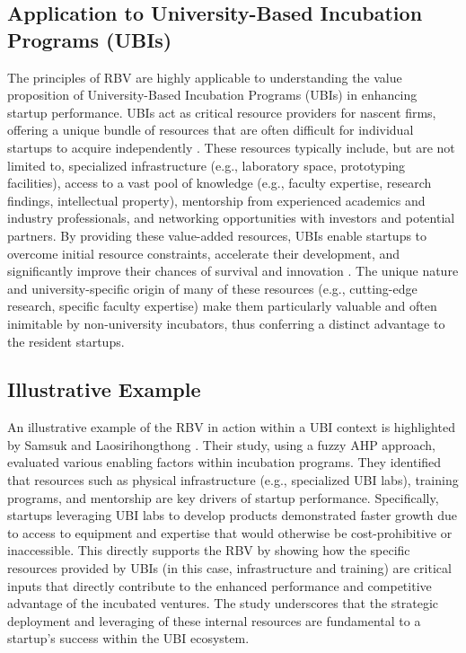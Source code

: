 \documentclass[../Main.tex]{subfiles}
\begin{document}
\subsection{Application to University-Based Incubation Programs (UBIs)}
The principles of RBV are highly applicable to understanding the value proposition of University-Based Incubation Programs (UBIs) in enhancing startup performance. UBIs act as critical resource providers for nascent firms, offering a unique bundle of resources that are often difficult for individual startups to acquire independently \cite{mian1996assessing}. These resources typically include, but are not limited to, specialized infrastructure (e.g., laboratory space, prototyping facilities), access to a vast pool of knowledge (e.g., faculty expertise, research findings, intellectual property), mentorship from experienced academics and industry professionals, and networking opportunities with investors and potential partners. By providing these value-added resources, UBIs enable startups to overcome initial resource constraints, accelerate their development, and significantly improve their chances of survival and innovation \cite{mian1996assessing}. The unique nature and university-specific origin of many of these resources (e.g., cutting-edge research, specific faculty expertise) make them particularly valuable and often inimitable by non-university incubators, thus conferring a distinct advantage to the resident startups.

\subsection{Illustrative Example}
An illustrative example of the RBV in action within a UBI context is highlighted by Samsuk and Laosirihongthong \cite{samsuk2014fuzzy}. Their study, using a fuzzy AHP approach, evaluated various enabling factors within incubation programs. They identified that resources such as physical infrastructure (e.g., specialized UBI labs), training programs, and mentorship are key drivers of startup performance. Specifically, startups leveraging UBI labs to develop products demonstrated faster growth due to access to equipment and expertise that would otherwise be cost-prohibitive or inaccessible. This directly supports the RBV by showing how the specific resources provided by UBIs (in this case, infrastructure and training) are critical inputs that directly contribute to the enhanced performance and competitive advantage of the incubated ventures. The study underscores that the strategic deployment and leveraging of these internal resources are fundamental to a startup's success within the UBI ecosystem.
\end{document}
